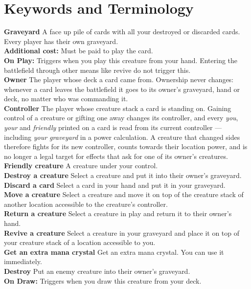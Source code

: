 \documentclass[conference]{IEEEtran}
\begin{document}
\section{Keywords and Terminology}
\label{sec:keywords}
\textbf{Graveyard} A face up pile of cards with all your destroyed or discarded cards. Every player has their own graveyard.\\
\textbf{Additional cost:} Must be paid to play the card.\\
\textbf{On Play:} Triggers when you play this creature from your hand. Entering the battlefield through other means like revive do not trigger this.\\
\textbf{Owner} The player whose deck a card came from. Ownership never changes: whenever a card leaves the battlefield it goes to its owner's graveyard, hand or deck, no matter who was commanding it.\\
\textbf{Controller} The player whose creature stack a card is standing on. Gaining control of a creature or gifting one away changes its controller, and every \emph{you}, \emph{your} and \emph{friendly} printed on a card is read from its current controller --- including \emph{your graveyard} in a power calculation. A creature that changed sides therefore fights for its new controller, counts towards their location power, and is no longer a legal target for effects that ask for one of its owner's creatures.\\
\textbf{Friendly creature} A creature under your control.\\
\textbf{Destroy a creature} Select a creature and put it into their owner's graveyard.\\
\textbf{Discard a card} Select a card in your hand and put it in your graveyard.\\
\textbf{Move a creature} Select a creature and move it on top of the creature stack of another location accessible to the creature's controller.\\
\textbf{Return a creature} Select a creature in play and return it to their owner's hand.\\
\textbf{Revive a creature} Select a creature in your graveyard and place it on top of your creature stack of a location accessible to you.\\
\textbf{Get an extra mana crystal} Get an extra mana crystal. You can use it immediately.\\
\textbf{Destroy} Put an enemy creature into their owner's graveyard.\\
\textbf{On Draw:} Triggers when you draw this creature from your deck.\\
\end{document}
